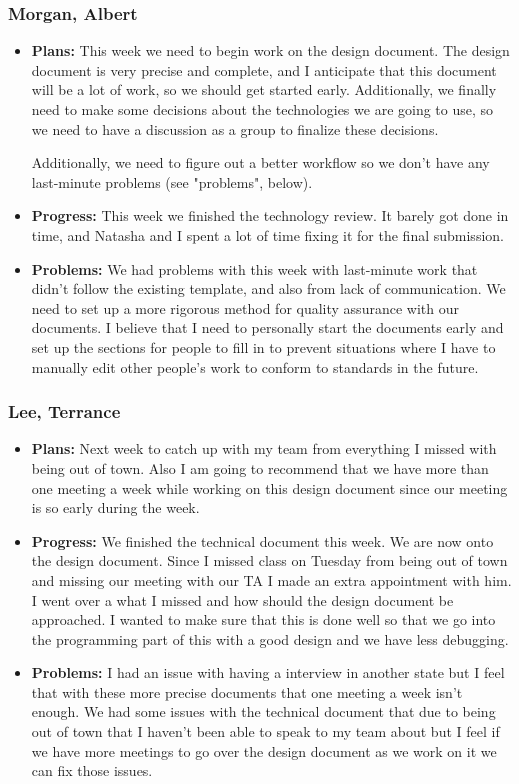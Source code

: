 \documentclass[10pt,draftclsnofoot,onecolumn]{IEEEtran}
\begin{document}
\subsubsection{Morgan, Albert}
\begin{itemize}
	\item \textbf{Plans: }
	This week we need to begin work on the design document. The design document is very precise and complete, and I anticipate that this document will be a lot of work, so we should get started early. Additionally, we finally need to make some decisions about the technologies we are going to use, so we need to have a discussion as a group to finalize these decisions.
	
	Additionally, we need to figure out a better workflow so we don't have any last-minute problems (see "problems", below).
	\item \textbf{Progress: }
	This week we finished the technology review. It barely got done in time, and Natasha and I spent a lot of time fixing it for the final submission.
	\item \textbf{Problems: }
	We had problems with this week with last-minute work that didn't follow the existing template, and also from lack of communication. We need to set up a more rigorous method for quality assurance with our documents. I believe that I need to personally start the documents early and set up the sections for people to fill in to prevent situations where I have to manually edit other people's work to conform to standards in the future.
\end{itemize}
\subsubsection{Lee, Terrance}
\begin{itemize}
	\item \textbf{Plans: }Next week to catch up with my team from everything I missed with being out of town. Also I am going to recommend that we have more than one meeting a week while working on this design document since our meeting is so early during the week.
	\item \textbf{Progress: }We finished the technical document this week. We are now onto the design document. Since I missed class on Tuesday from being out of town and missing our meeting with our TA I made an extra appointment with him. I went over a what I missed and how should the design document be approached. I wanted to make sure that this is done well so that we go into the programming part of this with a good design and we have less debugging.
	\item \textbf{Problems: }I had an issue with having a interview in another state but I feel that with these more precise documents that one meeting a week isn't enough. We had some issues with the technical document that due to being out of town that I haven't been able to speak to my team about but I feel if we have more meetings to go over the design document as we work on it we can fix those issues.
\end{itemize}
\end{document}
